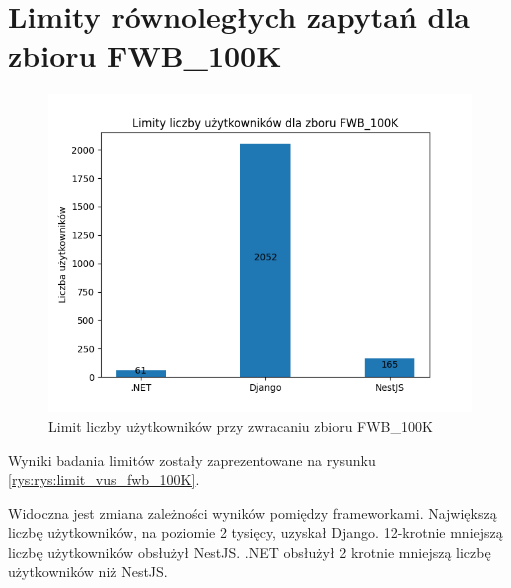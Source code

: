 \section{Limity równoległych zapytań dla zbioru FWB\_100K}

\begin{figure}[!hb]
	\centering \includegraphics[width=1\linewidth]{rysunki/Limity_liczby_uzytkownikow_dla_zboru_FWB_100K.png}
	\caption{Limit liczby użytkowników przy zwracaniu zbioru FWB\_100K}
	\label{rys:limit_vus_fwb_100K}
\end{figure}

Wyniki badania limitów zostały zaprezentowane na rysunku \ref{rys:rys:limit_vus_fwb_100K}.

Widoczna jest zmiana zależności wyników pomiędzy frameworkami.
Największą liczbę użytkowników, na poziomie 2 tysięcy, uzyskał Django.
12-krotnie mniejszą liczbę użytkowników obsłużył NestJS.
.NET obsłużył 2 krotnie mniejszą liczbę użytkowników niż NestJS.